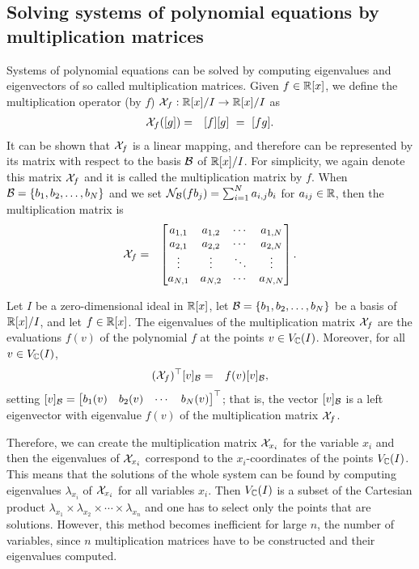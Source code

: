 \subsection{Solving systems of polynomial equations by multiplication matrices}
Systems of polynomial equations can be solved by computing eigenvalues and eigenvectors of so called multiplication matrices.
Given $f\in\mathbb{R}[x]$, we define the multiplication operator (by $f$) $\mathcal{X}_f: \mathbb{R}[x]/I \rightarrow \mathbb{R}[x]/I$ as
\begin{eqnarray}
  \mathcal{X}_f([g]) &=& [f][g]\ =\ [fg].
\end{eqnarray}
It can be shown that $\mathcal{X}_f$ is a linear mapping, and therefore can be represented by its matrix with respect to the basis $\mathcal{B}$ of $\mathbb{R}[x]/I$.
For simplicity, we again denote this matrix $\mathcal{X}_f$ and it is called the multiplication matrix by $f$.
When $\mathcal{B} = \{b_1, b_2, \ldots, b_N\}$ and we set $\mathcal{N}_{\mathcal{B}}(fb_j) = \sum_{i=1}^N a_{i,j}b_i$ for $a_{ij}\in\mathbb{R}$, then the multiplication matrix is
\begin{eqnarray}
  \mathcal{X}_f &=& \begin{bmatrix} a_{1,1} & a_{1,2} & \cdots & a_{1,N}\\
                 a_{2,1} & a_{2,2} & \cdots & a_{2,N}\\
                 \vdots & \vdots & \ddots & \vdots\\
                 a_{N,1} & a_{N,2} & \cdots & a_{N,N}\end{bmatrix}.
\end{eqnarray}

\begin{theorem}
  Let $I$ be a zero-dimensional ideal in $\mathbb{R}[x]$, let $\mathcal{B} = \{b_1, b_2, \dots, b_N\}$ be a basis of $\mathbb{R}[x]/I$, and let $f\in\mathbb{R}[x]$.
  The eigenvalues of the multiplication matrix $\mathcal{X}_f$ are the evaluations $f(v)$ of the polynomial $f$ at the points $v\in V_{\mathbb{C}}(I)$.
  Moreover, for all $v\in V_{\mathbb{C}}(I)$,
  \begin{eqnarray}
    (\mathcal{X}_f)^\top[v]_{\mathcal{B}} &=& f(v)[v]_{\mathcal{B}},
  \end{eqnarray}
  setting $[v]_{\mathcal{B}} = \begin{bmatrix} b_1(v) & b_2(v) & \cdots & b_N(v)\end{bmatrix}^\top$; that is, the vector $[v]_{\mathcal{B}}$ is a left eigenvector with eigenvalue $f(v)$ of the multiplication matrix $\mathcal{X}_f$.
\end{theorem}

Therefore, we can create the multiplication matrix $\mathcal{X}_{x_i}$ for the variable $x_i$ and then the eigenvalues of $\mathcal{X}_{x_i}$ correspond to the $x_i$-coordinates of the points $V_{\mathbb{C}}(I)$.
This means that the solutions of the whole system can be found by computing eigenvalues $\lambda_{x_i}$ of $\mathcal{X}_{x_i}$ for all variables $x_i$.
Then $V_{\mathbb{C}}(I)$ is a subset of the Cartesian product $\lambda_{x_1} \times \lambda_{x_2} \times \cdots \times \lambda_{x_n}$ and one has to select only the points that are solutions.
However, this method becomes inefficient for large $n$, the number of variables, since $n$ multiplication matrices have to be constructed and their eigenvalues computed.


